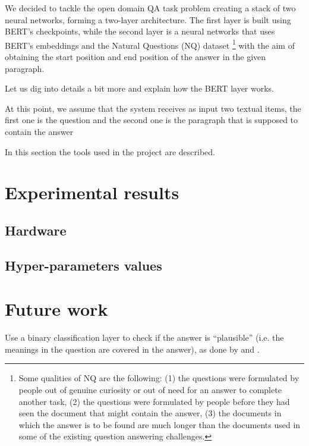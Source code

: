 \documentclass[12pt,a4paper,hidelinks]{article}
\begin{document}
We decided to tackle the open domain QA task problem creating a stack of two neural networks, forming a two-layer architecture. The first layer is built using BERT's \cite{devlin2018bert} checkpoints, while the second layer is a neural networks that uses BERT's embeddings and the Natural Questions (NQ) \cite{kwiatowski} dataset \footnote{Some qualities of NQ are the following: (1) the questions were formulated by people out of genuine curiosity or out of need for an answer to complete another task, (2) the questions were formulated by people before they had seen the document that might contain the answer, (3) the documents in which the answer is to be found are much longer than the documents used in some of the existing question answering challenges.} with the aim of obtaining the start position and end position of the answer in the given paragraph.

Let us dig into details a bit more and explain how the BERT layer works.



At this point, we assume that the system receives as input two textual items, the first one is the question and the second one is the paragraph that is supposed to contain the answer


In this section the tools used in the project are described.

\section{Experimental results}\label{sec:experimental_results}


\subsection{Hardware}


\subsection{Hyper-parameters values}

\section{Future work}\label{sec:future_work}
Use a binary classification layer to check if the answer is ``plausible'' (i.e. the meanings in the question are covered in the answer), as done by \cite{Hu2019ReadV} and \cite{Back2020NeurQuRI}.
\end{document}
